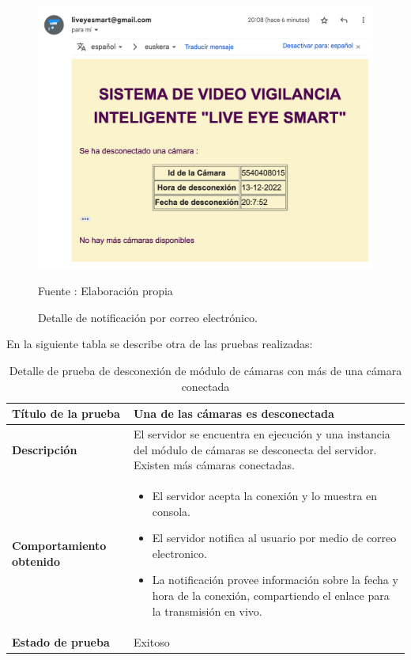 \begin{figure}[H]
    \begin{center}
        \includegraphics[width=12cm]{img/capitulo_6/mail4.png}
    \end{center}
    \begin{center}
        \caption{Detalle de notificación por correo electrónico.}
        Fuente : Elaboración propia
    \end{center}
\end{figure}

En la siguiente tabla se describe otra de las pruebas realizadas:\\

\begin{table}[H]
    \caption{Detalle de prueba de desconexión de módulo de cámaras con más de una cámara conectada}
    \begin{center}
        \begin{tabular}{|>{\centering}p{}|m{}<{\centering}|} 
            \hline
            \textbf{Título de la prueba} & Una de las cámaras es desconectada \\
            \hline
            \textbf{Descripción} & El servidor se encuentra en ejecución y una instancia del módulo de cámaras se desconecta del servidor. Existen más cámaras conectadas.\\
            \hline
            \textbf{Comportamiento obtenido} & 
            \begin{itemize}
                \item El servidor acepta la conexión y lo muestra en consola.
                \item El servidor notifica al usuario por medio de correo electronico.
                \item La notificación provee información sobre la fecha y hora de la conexión, compartiendo el enlace para la transmisión en vivo.
            \end{itemize} \\ 
            \hline
            \textbf{Estado de prueba} & Exitoso \\
            \hline
        \end{tabular}
    \end{center}
\end{table}


